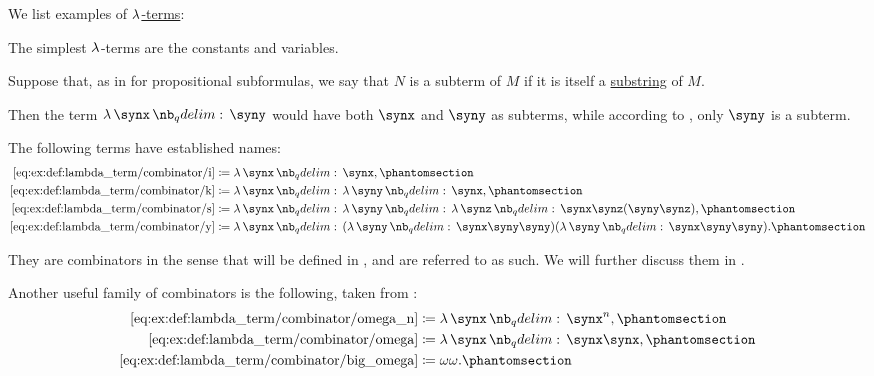 \begin{example}\label{ex:def:lambda_term}
  We list examples of \hyperref[def:lambda_term]{\( \mathrm{\lambda} \)-terms}:
  \begin{thmenum}
     The simplest \( \mathrm{\lambda} \)-terms are the constants and variables.

     Suppose that, as in  for propositional subformulas, we say that \( N \) is a subterm of \( M \) if it is itself a \hyperref[def:formal_language/substring]{substring} of \( M \).

    Then the term \( \qabs \synx \syny \) would have both \( \synx \) and \( \syny \) as subterms, while according to , only \( \syny \) is a subterm.

     The following terms have established names:
    \begin{align*}
      \ref{eq:ex:def:lambda_term/combinator/i} &\coloneqq \qabs \synx \synx,                                                           \taglabel[I]{eq:ex:def:lambda_term/combinator/i} \\
      \ref{eq:ex:def:lambda_term/combinator/k} &\coloneqq \qabs \synx \qabs \syny \synx,                                               \taglabel[K]{eq:ex:def:lambda_term/combinator/k} \\
      \ref{eq:ex:def:lambda_term/combinator/s} &\coloneqq \qabs \synx \qabs \syny \qabs \synz \synx \synz (\syny \synz),               \taglabel[S]{eq:ex:def:lambda_term/combinator/s} \\
      \ref{eq:ex:def:lambda_term/combinator/y} &\coloneqq \qabs \synx (\qabs \syny \synx \syny \syny) (\qabs \syny \synx \syny \syny). \taglabel[Y]{eq:ex:def:lambda_term/combinator/y}
    \end{align*}

    They are combinators in the sense that will be defined in , and are referred to as such. We will further discuss them in .

    Another useful family of combinators is the following, taken from \cite[\S 3.1.21; \S 6.2.1]{Barendregt1984LambdaCalculus}:
    \begin{align*}
      \ref{eq:ex:def:lambda_term/combinator/omega_n}   &\coloneqq \qabs \synx \synx^n,     \taglabel[\ensuremath{ \omega_n }]{eq:ex:def:lambda_term/combinator/omega_n} \\
      \ref{eq:ex:def:lambda_term/combinator/omega}     &\coloneqq \qabs \synx \synx \synx, \taglabel[\ensuremath{ \omega }]{eq:ex:def:lambda_term/combinator/omega} \\
      \ref{eq:ex:def:lambda_term/combinator/big_omega} &\coloneqq \omega \omega.           \taglabel[\ensuremath{ \Omega }]{eq:ex:def:lambda_term/combinator/big_omega}
    \end{align*}
  \end{thmenum}
\end{example}

